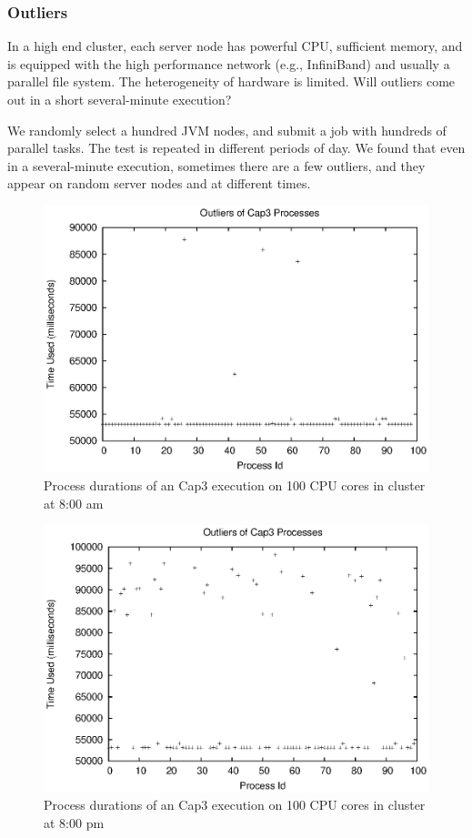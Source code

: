 \subsubsection{Outliers}
In a high end cluster, each server node has powerful CPU, sufficient memory, and is equipped
with the high performance network (e.g., InfiniBand) and usually a parallel file system. The heterogeneity
of hardware is limited. Will outliers come out in a short several-minute execution?

We randomly select a hundred JVM nodes, and submit a job with hundreds
of parallel tasks. The test is repeated in different periods of
day. We found that even in a several-minute execution, sometimes
there are a few outliers, and they appear on random server nodes and at different times.

\begin{figure}
\centering
\includegraphics[width=0.9\columnwidth]{figures/outliers.eps}
\caption{Process durations of an Cap3 execution on 100 CPU cores in cluster at 8:00 am}
\label{figure:outlier}
\end{figure}

\begin{figure}
\centering
\includegraphics[width=0.9\columnwidth]{figures/yaoutliers.eps}
\caption{Process durations of an Cap3 execution on 100 CPU cores in cluster at 8:00 pm}
\label{figure:yaoutlier}
\end{figure}

